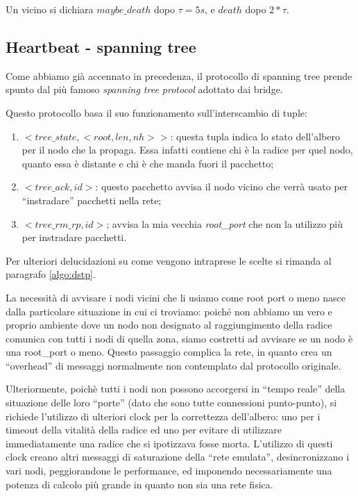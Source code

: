 \documentclass[italian]{memoir}
\begin{document}
Un vicino si dichiara $maybe\_death$ dopo $\tau = 5s$, e $death$ dopo $2*\tau$.

\subsection{Heartbeat - spanning tree}
Come abbiamo già accennato in precedenza, il protocollo di spanning tree prende spunto dal più famoso \textit{spanning tree protocol} adottato dai bridge. 

Questo protocollo basa il suo funzionamento sull'interscambio di tuple:
\begin{enumerate}
\item $<tree\_state,<root,len,nh>>$: questa tupla indica lo stato dell'albero per il nodo che la propaga. Essa infatti contiene chi è la radice per quel nodo, quanto essa è distante e chi è che manda fuori il pacchetto;
\item $<tree\_ack, id>$: questo pacchetto avvisa il nodo vicino che verrà usato per ``instradare'' pacchetti nella rete;
\item $<tree\_rm\_rp, id>$; avvisa la mia vecchia \textit{root\_port} che non la utilizzo più per instradare pacchetti.
\end{enumerate}
Per ulteriori delucidazioni su come vengono intraprese le scelte si rimanda al paragrafo \ref{algo:dstp}.

La necessità di avvisare i nodi vicini che li usiamo come root port o meno nasce dalla particolare situazione in cui ci troviamo: poiché non abbiamo un vero e proprio ambiente dove un nodo non designato al raggiungimento della radice comunica con tutti i nodi di quella zona, siamo costretti ad avvisare se un nodo è una root\_port o meno. Questo passaggio complica la rete, in quanto crea un ``overhead'' di messaggi normalmente non contemplato dal protocollo originale.

Ulteriormente, poichè tutti i nodi non possono accorgersi in ``tempo reale'' della situazione delle loro ``porte'' (dato che sono tutte connessioni punto-punto), si richiede l'utilizzo di ulteriori clock per la correttezza dell'albero: uno per i timeout della vitalità della radice ed uno per evitare di utilizzare immediatamente una radice che si ipotizzava fosse morta. L'utilizzo di questi clock creano altri messaggi di saturazione della ``rete emulata'', desincronizzano i vari nodi, peggiorandone le performance, ed imponendo necessariamente una potenza di calcolo più grande in quanto non sia una rete fisica.
\end{document}
